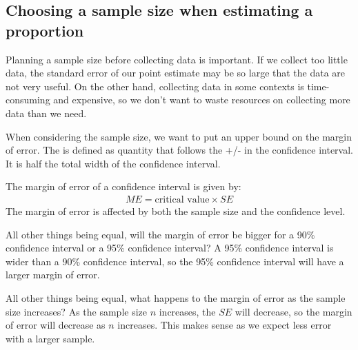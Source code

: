 \subsection{Choosing a sample size when estimating a proportion}


Planning a sample size before collecting data is important. If we collect too little data, the standard error of our point estimate may be so large that the data are not very useful. On the other hand, collecting data in some contexts is time-consuming and expensive, so we don't want to waste resources on collecting more data than we need.

When considering the sample size, we want to put an upper bound on the margin of error. The  is defined as quantity that follows the +/- in the confidence interval. It is half the total width of the confidence interval.

\begin{termBox}{
The margin of error of a confidence interval is given by: 
\begin{align*}
ME = \text{critical value}\times SE
\end{align*}
The margin of error is affected by both the sample size and the confidence level.
}
\end{termBox}

\begin{example}{All other things being equal, will the margin of error be bigger for a 90\% confidence interval or a 95\% confidence interval?}
A 95\% confidence interval is wider than a 90\% confidence interval, so the 95\% confidence interval will have a larger margin of error.
\end{example}

\begin{example}{All other things being equal, what happens to the margin of error as the sample size increases?}
As the sample size $n$ increases, the $SE$ will decrease, so the margin of error will decrease as $n$ increases. This makes sense as we expect less error with a larger sample.
\end{example}

